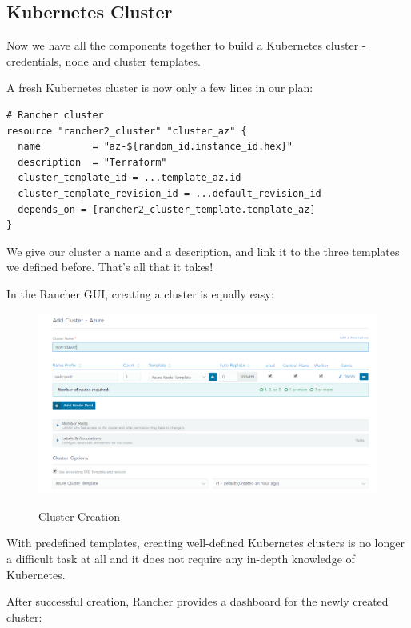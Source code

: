\subsection{Kubernetes Cluster}

Now we have all the components together to build a Kubernetes cluster - credentials, node and cluster templates. 

A fresh Kubernetes cluster is now only a few lines in our plan:

\begin{lstlisting}[caption=Kubernetes Cluster, frame=single, basicstyle=\ttfamily]
# Rancher cluster
resource "rancher2_cluster" "cluster_az" {
  name         = "az-${random_id.instance_id.hex}"
  description  = "Terraform"
  cluster_template_id = ...template_az.id
  cluster_template_revision_id = ...default_revision_id
  depends_on = [rancher2_cluster_template.template_az]
}
\end{lstlisting}

We give our cluster a name and a description, and link it to the three templates we defined before. That's all that it takes!

In the Rancher GUI, creating a cluster is equally easy:

\begin{figure}[H]
\centering
\caption {Cluster Creation}
\includegraphics[width=\linewidth]{images/cluster-creation.png}
\label{fig:clusterCreation}
\end{figure}

With predefined templates, creating well-defined Kubernetes clusters is no longer a difficult task at all and it  does not require any in-depth knowledge of Kubernetes.

After successful creation, Rancher provides a dashboard for the newly created cluster:

